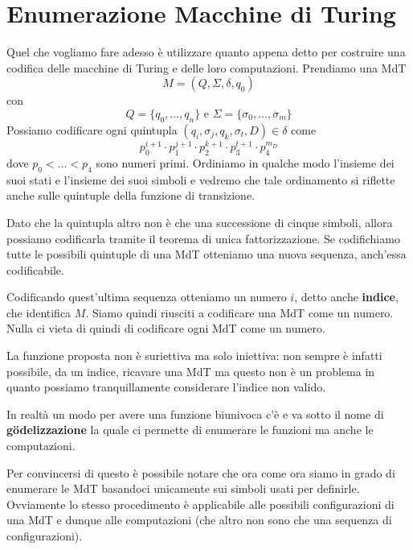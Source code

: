 \section{Enumerazione Macchine di Turing}
\label{ssec: enum MdT}
Quel che vogliamo fare adesso è utilizzare quanto appena detto
per costruire una codifica delle macchine di Turing e delle
loro computazioni. Prendiamo una MdT
\[ M = (Q, \Sigma, \delta, q_0) \]
con
\[
	Q = \{ q_0, \dots, q_n \} \text { e }
	\Sigma = \{ \sigma_0, \dots, \sigma_m \}
\]
Possiamo codificare ogni quintupla
$(q_i, \sigma_j, q_k, \sigma_t, D) \in \delta$ come
\[
	p_0^{i+1} \cdot p_1^{j+1} \cdot
	p_2^{k+1} \cdot p_3^{t+1} \cdot p_4^{m_D}
\]
dove $p_0 < \dots < p_4$ sono numeri primi. Ordiniamo in qualche
modo l'insieme dei suoi stati e l'insieme dei suoi simboli e
vedremo che tale ordinamento si riflette anche sulle quintuple
della funzione di transizione.

Dato che la quintupla altro non è che una successione di cinque
simboli, allora possiamo codificarla tramite il teorema di unica
fattorizzazione. Se codifichiamo tutte le possibili quintuple di
una MdT otteniamo una nuova sequenza, anch'essa codificabile.

Codificando quest'ultima sequenza otteniamo un numero $i$,
detto anche \textbf{indice}, che identifica $M$. Siamo quindi
riusciti a codificare una MdT come un numero. Nulla ci vieta
di quindi di codificare ogni MdT come un numero.

La funzione proposta non è suriettiva ma solo iniettiva: non
sempre è infatti possibile, da un indice, ricavare una MdT
ma questo non è un problema in quanto possiamo tranquillamente
considerare l'indice non valido.

In realtà un modo per avere una funzione biunivoca c'è e va
sotto il nome di \textbf{g\"odelizzazione} la quale ci permette
di enumerare le funzioni ma anche le computazioni.

Per convincersi di questo è possibile notare che ora come ora
siamo in grado di enumerare le MdT basandoci unicamente sui
simboli usati per definirle. Ovviamente lo stesso procedimento
è applicabile alle possibili configurazioni di una MdT e dunque
alle computazioni (che altro non sono che una sequenza di
configurazioni).
